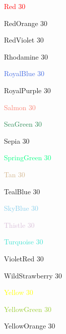 \documentclass[12pt,a4paper]{article}
\begin{document}
\textcolor{Red}{Red $30$}

\textcolor{RedOrange}{RedOrange $30$}

\textcolor{RedViolet}{RedViolet $30$}

\textcolor{Rhodamine}{Rhodamine $30$}

\textcolor{RoyalBlue}{RoyalBlue $30$}
 	 	 	
\textcolor{RoyalPurple}{RoyalPurple $30$}

\textcolor{Salmon}{Salmon $30$}

\textcolor{SeaGreen}{SeaGreen $30$}

\textcolor{Sepia}{Sepia $30$}

\textcolor{SpringGreen}{SpringGreen $30$} 	 	 	

\textcolor{Tan}{Tan $30$} 	 	

\textcolor{TealBlue}{TealBlue $30$} 	 	

\textcolor{SkyBlue}{SkyBlue $30$} 	 	 	 	 	

\textcolor{Thistle}{Thistle $30$}

\textcolor{Turquoise}{Turquoise $30$}

\textcolor{VioletRed}{VioletRed $30$}

\textcolor{WildStrawberry}{WildStrawberry $30$}


\textcolor{Yellow}{Yellow $30$}
 	 	 	
\textcolor{YellowGreen}{YellowGreen $30$} 	 	 	

\textcolor{YellowOrange}{YellowOrange $30$}
 	 	
\end{document}
